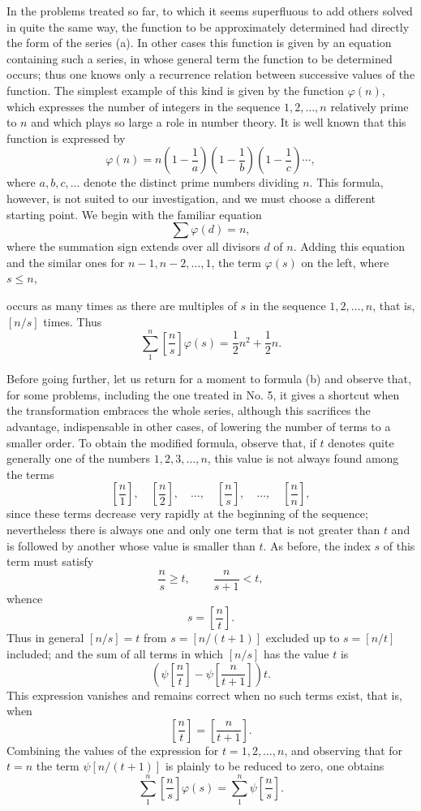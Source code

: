 \documentclass[11pt]{article}
\newcommand{\floor}[1]{\left[#1\right]}
\begin{document}
In the problems treated so far, to which it seems superfluous to add others solved in quite the same way, the function to be approximately determined had directly the form of the series (a). In other cases this function is given by an equation containing such a series, in whose general term the function to be determined occurs; thus one knows only a recurrence relation between successive values of the function. The simplest example of this kind is given by the function $\varphi(n)$, which expresses the number of integers in the sequence $1,2,\ldots,n$ relatively prime to $n$ and which plays so large a role in number theory. It is well known that this function is expressed by
\[
 \varphi(n)=n\left(1-\frac1a\right)\left(1-\frac1b\right)\left(1-\frac1c\right)\cdots,
\]
where $a,b,c,\ldots$ denote the distinct prime numbers dividing $n$. This formula, however, is not suited to our investigation, and we must choose a different starting point. We begin with the familiar equation
\[
 \sum \varphi(d)=n,
\]
where the summation sign extends over all divisors $d$ of $n$. Adding this equation and the similar ones for $n-1,n-2,\ldots,1$, the term $\varphi(s)$ on the left, where $s\leq n$,

occurs as many times as there are multiples of $s$ in the sequence $1,2,\ldots,n$, that is, $\floor{n/s}$ times. Thus
\[
 \sum_{1}^{n}\floor{\frac ns}\varphi(s)=\frac12 n^2+\frac12 n.
\]

Before going further, let us return for a moment to formula (b) and observe that, for some problems, including the one treated in No. 5, it gives a shortcut when the transformation embraces the whole series, although this sacrifices the advantage, indispensable in other cases, of lowering the number of terms to a smaller order. To obtain the modified formula, observe that, if $t$ denotes quite generally one of the numbers $1,2,3,\ldots,n$, this value is not always found among the terms
\[
 \floor{\frac n1},\quad \floor{\frac n2},\quad \ldots,\quad
 \floor{\frac ns},\quad \ldots,\quad \floor{\frac nn},
\]
since these terms decrease very rapidly at the beginning of the sequence; nevertheless there is always one and only one term that is not greater than $t$ and is followed by another whose value is smaller than $t$. As before, the index $s$ of this term must satisfy
\[
 \frac ns\geq t,
 \qquad \frac n{s+1}<t,
\]
whence
\[
 s=\floor{\frac nt}.
\]
Thus in general $\floor{n/s}=t$ from $s=\floor{n/(t+1)}$ excluded up to $s=\floor{n/t}$ included; and the sum of all terms in which $\floor{n/s}$ has the value $t$ is
\[
 \left(\psi\floor{\frac nt}-\psi\floor{\frac n{t+1}}\right)t.
\]
This expression vanishes and remains correct when no such terms exist, that is, when
\[
 \floor{\frac nt}=\floor{\frac n{t+1}}.
\]
Combining the values of the expression for $t=1,2,\ldots,n$, and observing that for $t=n$ the term $\psi\floor{n/(t+1)}$ is plainly to be reduced to zero, one obtains
\begin{equation}
 \sum_{1}^{n}\floor{\frac ns}\varphi(s)=\sum_{1}^{n}\psi\floor{\frac ns}. \tag{c}
\end{equation}
\end{document}
